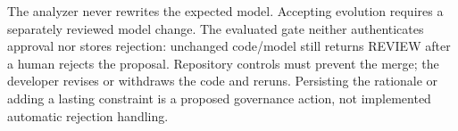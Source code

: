The analyzer never rewrites the expected model. Accepting evolution requires a separately reviewed model change. The evaluated gate neither authenticates approval nor stores rejection: unchanged code/model still returns REVIEW after a human rejects the proposal. Repository controls must prevent the merge; the developer revises or withdraws the code and reruns. Persisting the rationale or adding a lasting constraint is a proposed governance action, not implemented automatic rejection handling.
